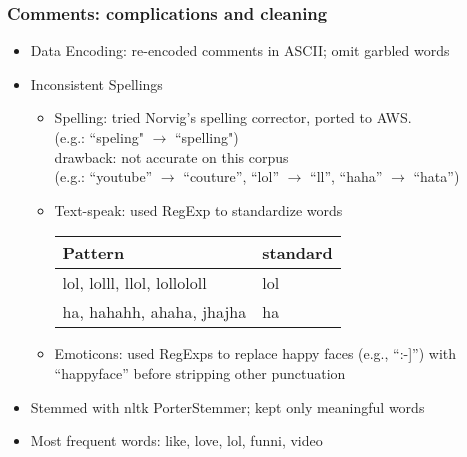 \documentclass[fleqn]{beamer}
\begin{document}
\begin{frame}
\frametitle{Comments: complications and cleaning}
    \begin{itemize}
   	\item Data Encoding: re-encoded comments in ASCII; omit garbled words
        \item Inconsistent Spellings 
        	\begin{itemize}
		\item Spelling: tried Norvig's spelling corrector, ported to AWS. \\
		(e.g.: ``speling"  $\rightarrow$ ``spelling")\\
                drawback: not accurate on this corpus\\
                  (e.g.: ``youtube'' $\rightarrow$ ``couture'', 
                    ``lol'' $\rightarrow$ ``ll'', ``haha'' $\rightarrow$ ``hata'')
                   \item Text-speak:  used RegExp to standardize words\\
		\begin{center}
        			\begin{tabular}{ | l | l |}
			\hline
			Pattern & standard \\ \hline
			lol, lolll, llol, lollololl & lol \\ \hline
			ha, hahahh, ahaha, jhajha & ha \\
			\hline
			\end{tabular}
					
      		\end{center}
		\item Emoticons: used RegExps to replace happy faces (e.g., ``:-]'') with 
                ``happyface'' 
                  before stripping other punctuation
	\end{itemize}
                \item Stemmed with nltk PorterStemmer; kept only meaningful words
                \item Most frequent words: like, love, lol, funni, video
    \end{itemize}
\end{frame}
\end{document}
